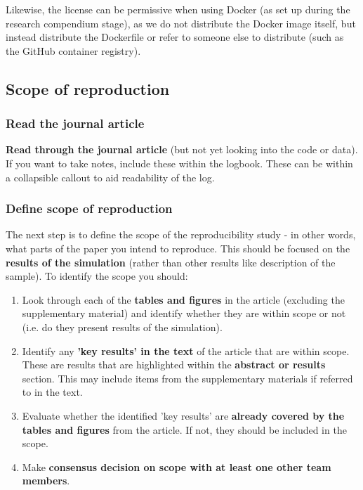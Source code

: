 Likewise, the license can be permissive when using Docker (as set up during the research compendium stage), as we do not distribute the Docker image itself, but instead distribute the Dockerfile or refer to someone else to distribute (such as the GitHub container registry).\autocite{the_linux_foundation_docker_nodate}

\vspace{0.5cm}
\subsection{Scope of reproduction}

\subsubsection{Read the journal article}

\textbf{Read through the journal article} (but not yet looking into the code or data). If you want to take notes, include these within the logbook. These can be within a collapsible callout to aid readability of the log.

\vspace{0.5cm}
\subsubsection{Define scope of reproduction}

The next step is to define the scope of the reproducibility study - in other words, what parts of the paper you intend to reproduce. This should be focused on the \textbf{results of the simulation} (rather than other results like description of the sample). To identify the scope you should:

\begin{enumerate}
    \item Look through each of the \textbf{tables and figures} in the article (excluding the supplementary material) and identify whether they are within scope or not (i.e. do they present results of the simulation).
    \item Identify any \textbf{'key results' in the text} of the article that are within scope. These are results that are highlighted within the \textbf{abstract or results} section. This may include items from the supplementary materials if referred to in the text.
    \item Evaluate whether the identified 'key results' are \textbf{already covered by the tables and figures} from the article. If not, they should be included in the scope.
    \item Make \textbf{consensus decision on scope with at least one other team members}.
\end{enumerate}

